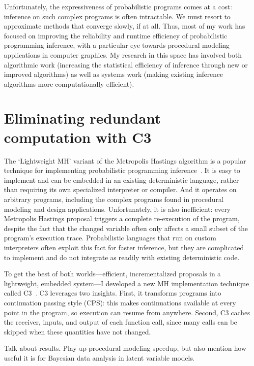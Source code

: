 \documentclass[
11pt, %
a4paper, %
oneside, %
headinclude,footinclude, %
BCOR5mm, %
]{scrartcl}
\begin{document}
Unfortunately, the expressiveness of probabilistic programs comes at a cost: inference on such complex programs is often intractable. We must resort to approximate methods that converge slowly, if at all. Thus, most of my work has focused on improving the reliability and runtime efficiency of probabilistic programming inference, with a particular eye towards procedural modeling applications in computer graphics. My research in this space has involved both algorithmic work (increasing the statistical efficiency of inference through new or improved algorithms) as well as systems work (making existing inference algorithms more computationally efficient).



\section*{Eliminating redundant computation with C3}

The `Lightweight MH' variant of the Metropolis Hastings algorithm is a popular technique for implementing probabilistic programming inference~\cite{Lightweight}. It is easy to implement and can be embedded in an existing deterministic language, rather than requiring its own specialized interpreter or compiler. And it operates on arbitrary programs, including the complex programs found in procedural modeling and design applications. Unfortunately, it is also inefficient: every Metropolis Hastings proposal triggers a complete re-execution of the program, despite the fact that the changed variable often only affects a small subset of the program's execution trace. Probabilistic languages that run on custom interpreters often exploit this fact for faster inference, but they are complicated to implement and do not integrate as readily with existing deterministic code.

To get the best of both worlds---efficient, incrementalized proposals in a lightweight, embedded system---I developed a new MH implementation technique called C3~\cite{C3}. C3 leverages two insights. First, it transforms programs into continuation passing style (CPS): this makes continuations available at every point in the program, so execution can resume from anywhere. Second, C3 caches the receiver, inputs, and output of each function call, since many calls can be skipped when these quantities have not changed.

Talk about results. Play up procedural modeling speedup, but also mention how useful it is for Bayesian data analysis in latent variable models.
\end{document}
